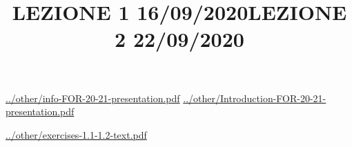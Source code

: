 \title{LEZIONE 1 16/09/2020}\newline
\newline
\url{../other/info-FOR-20-21-presentation.pdf}\newline
\url{../other/Introduction-FOR-20-21-presentation.pdf}
\newpage
\title{LEZIONE 2 22/09/2020}\newline
\newline
\url{../other/exercises-1.1-1.2-text.pdf}\newline